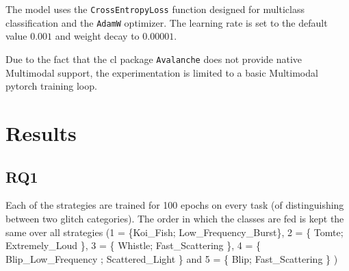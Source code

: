 The model uses the \verb|CrossEntropyLoss| function designed for multiclass classification and the \verb|AdamW| optimizer. The learning rate is set to the default value $0.001$ and weight decay to $0.00001$.

Due to the fact that the \acrshort{cl} package \verb|Avalanche| \citep{lomonaco2021avalanche} does not provide native Multimodal support, the experimentation is limited to a basic Multimodal pytorch training loop. 
\newpage
\section{Results}
\subsection{RQ1}
\label{subsec:RQ1}
Each of the strategies are trained for 100 epochs on every task (of distinguishing between two glitch categories). The order in which the classes are fed is kept the same over all strategies (1 = \{Koi\_Fish; Low\_Frequency\_Burst\}, 2 = \{ Tomte; Extremely\_Loud \}, 3 = \{ Whistle; Fast\_Scattering \}, 4 = \{ Blip\_Low\_Frequency ; Scattered\_Light \} and 5 = \{ Blip; Fast\_Scattering \} )

